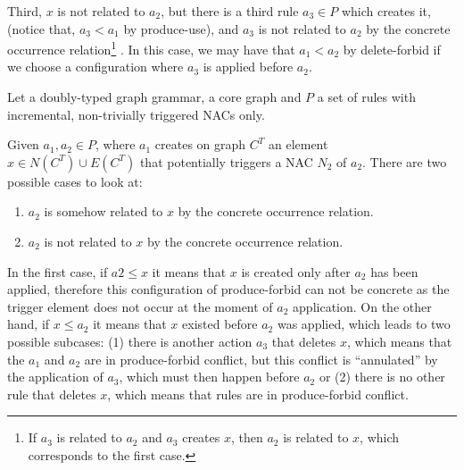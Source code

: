 \begin{definition}
  Third, $x$ is not related to $a_2$, but there is a third rule $a_3 \in P$ which creates it, (notice that, $a_3 < a_1$ by produce-use), and $a_3$ is not related to $a_2$ by the concrete occurrence relation\footnote{If $a_3$ is related to $a_2$ and $a_3$ creates $x$, then $a_2$ is related to $x$, which corresponds to the first case.}
. In this case, we may have that $a_1 < a_2$ by delete-forbid if we choose a configuration where $a_3$ is applied before $a_2$.


\end{definition}

\begin{definition} Let \doublyTypedGraphGrammarCore{} a doubly-typed graph grammar, \coreGraph{} a core graph and $P$ a set of rules with incremental, non-trivially triggered NACs only.

  Given $a_1,a_2 \in P$, where $a_1$ creates on graph $C^T$ an element $x \in N(C^T) \cup E(C^T)$ that potentially triggers a NAC $N_2$ of $a_2$. There are two possible cases to look at:

  \begin{enumerate}
    \item $a_2$ is somehow related to $x$ by the concrete occurrence relation.
    \item $a_2$ is not related to $x$ by the concrete occurrence relation.
  \end{enumerate}

  In the first case, if $a2 \leq x$ it means that $x$ is created only after $a_2$ has been applied, therefore this configuration of produce-forbid can not be concrete as the trigger element does not occur at the moment of $a_2$ application. On the other hand, if $x \leq a_2$ it means that $x$ existed before $a_2$ was applied, which leads to two possible subcases: (1) there is another action $a_3$ that deletes $x$, which means that the $a_1$ and $a_2$ are in produce-forbid conflict, but this
  conflict is ``annulated'' by the application of $a_3$, which must then happen before $a_2$ or (2) there is no other rule that deletes $x$, which means that rules are in
  produce-forbid conflict.
\end{definition}

